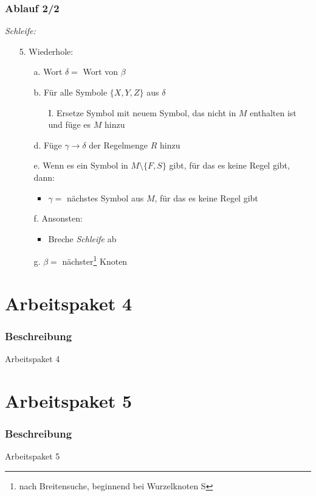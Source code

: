 \documentclass[12pt]{beamer}
\begin{document}
    \begin{frame}
        \frametitle{Ablauf 2/2}
        \textit{Schleife:}
        \begin{itemize}
            \item[5.] Wiederhole:
            \begin{itemize}
                \item[a.] Wort $\delta=$ Wort von $\beta$
                \item[b.] Für alle Symbole $\{X,Y,Z\}$ aus $\delta$
                \begin{itemize}
                    \item[I.] Ersetze Symbol mit neuem Symbol, das nicht in $M$ enthalten ist und füge es $M$ hinzu
                \end{itemize}
                \item[d.] Füge $\gamma\rightarrow\delta$ der Regelmenge $R$ hinzu
                \item[e.] Wenn es ein Symbol in $M\setminus\{F,S\}$ gibt, für das es keine Regel gibt, dann:
                \begin{itemize}
                    \item $\gamma=$ nächstes Symbol aus $M$, für das es keine Regel gibt
                \end{itemize}
                \item[f.] Ansonsten:
                \begin{itemize}
                    \item Breche \textit{Schleife} ab
                \end{itemize}
                \item[g.] $\beta=$ nächster\footnote{nach Breitensuche, beginnend bei Wurzelknoten S} Knoten
            \end{itemize}
        \end{itemize}
    \end{frame}

    \section{Arbeitspaket 4}
    \label{sec:4}

    \begin{frame}
        \frametitle{Beschreibung}
        Arbeitspaket 4
    \end{frame}

    \section{Arbeitspaket 5}
    \label{sec:5}

    \begin{frame}
        \frametitle{Beschreibung}
        Arbeitspaket 5
    \end{frame}
\end{document}
